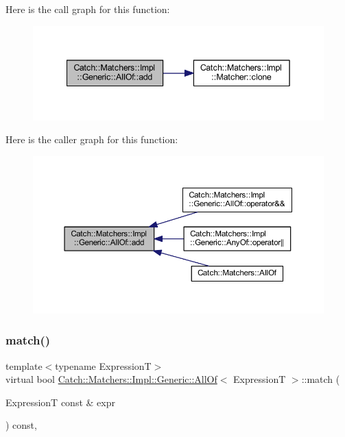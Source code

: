 Here is the call graph for this function\+:\nopagebreak
\begin{figure}[H]
\begin{center}
\leavevmode
\includegraphics[width=342pt]{class_catch_1_1_matchers_1_1_impl_1_1_generic_1_1_all_of_a8c5cd1e494ab697076da418ee72ac297_cgraph}
\end{center}
\end{figure}
Here is the caller graph for this function\+:\nopagebreak
\begin{figure}[H]
\begin{center}
\leavevmode
\includegraphics[width=350pt]{class_catch_1_1_matchers_1_1_impl_1_1_generic_1_1_all_of_a8c5cd1e494ab697076da418ee72ac297_icgraph}
\end{center}
\end{figure}
\hypertarget{class_catch_1_1_matchers_1_1_impl_1_1_generic_1_1_all_of_a95231b6a455e1a646d0b54bce55138be}{}\label{class_catch_1_1_matchers_1_1_impl_1_1_generic_1_1_all_of_a95231b6a455e1a646d0b54bce55138be} 
\subsubsection{\texorpdfstring{match()}{match()}}
{\footnotesize\ttfamily template$<$typename ExpressionT$>$ \\
virtual bool \hyperlink{class_catch_1_1_matchers_1_1_impl_1_1_generic_1_1_all_of}{Catch\+::\+Matchers\+::\+Impl\+::\+Generic\+::\+All\+Of}$<$ ExpressionT $>$\+::match (\begin{DoxyParamCaption}\item[{ExpressionT const \&}]{expr }\end{DoxyParamCaption}) const\hspace{0.3cm}{\ttfamily [inline]}, {\ttfamily [virtual]}}



